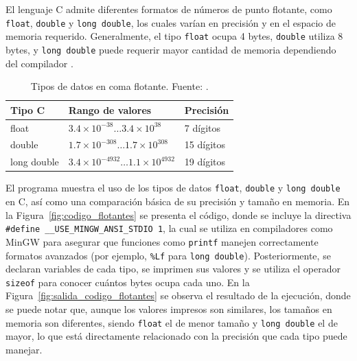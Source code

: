 El lenguaje C admite diferentes formatos de números de punto flotante, como \texttt{float}, \texttt{double} y \texttt{long double}, los cuales varían en precisión y en el espacio de memoria requerido. Generalmente, el tipo \texttt{float} ocupa 4 bytes, \texttt{double} utiliza 8 bytes, y \texttt{long double} puede requerir mayor cantidad de memoria dependiendo del compilador \cite{frem_ref2}.

\begin{table}[H]
    \centering
    \begin{tabular}{|p{3cm}|p{5cm}|p{3cm}|}
        \hline
        \textbf{Tipo C} & \textbf{Rango de valores} & \textbf{Precisión} \\
        \hline

        float & $3.4 \times 10^{-38} \dots 3.4 \times 10^{38}$ & 7 dígitos \\
        \hline

        double & $1.7 \times 10^{-308} \dots 1.7 \times 10^{308}$ & 15 dígitos \\
        \hline

        long double & $3.4 \times 10^{-4932} \dots 1.1 \times 10^{4932}$ & 19 dígitos \\
        \hline

    \end{tabular}
    \caption{Tipos de datos en coma flotante. Fuente: \cite{frem_ref2}.}
    \label{tab:flotantes}
\end{table}

El programa muestra el uso de los tipos de datos \texttt{float}, \texttt{double} y \texttt{long double} en C, así como una comparación básica de su precisión y tamaño en memoria. En la Figura~\ref{fig:codigo_flotantes} se presenta el código, donde se incluye la directiva \texttt{\#define \_\_USE\_MINGW\_ANSI\_STDIO 1}, la cual se utiliza en compiladores como MinGW para asegurar que funciones como \texttt{printf} manejen correctamente formatos avanzados (por ejemplo, \texttt{\%Lf} para \texttt{long double}). Posteriormente, se declaran variables de cada tipo, se imprimen sus valores y se utiliza el operador \texttt{sizeof} para conocer cuántos bytes ocupa cada uno. En la Figura~\ref{fig:salida_codigo_flotantes} se observa el resultado de la ejecución, donde se puede notar que, aunque los valores impresos son similares, los tamaños en memoria son diferentes, siendo \texttt{float} el de menor tamaño y \texttt{long double} el de mayor, lo que está directamente relacionado con la precisión que cada tipo puede manejar.

